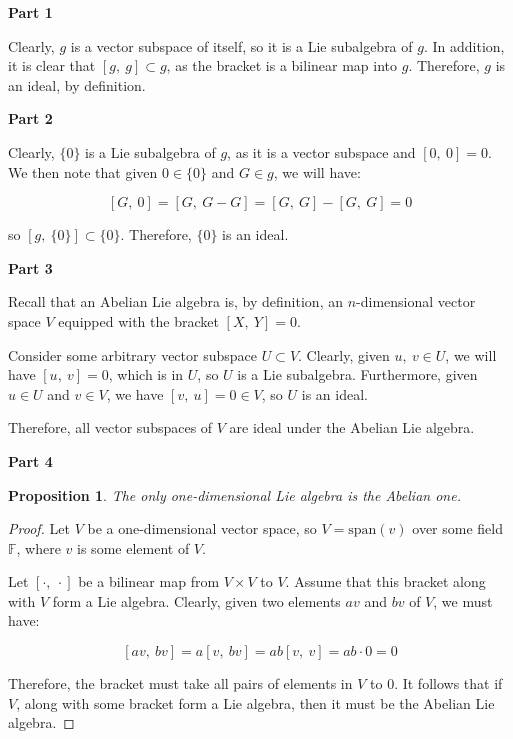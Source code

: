 \documentclass[10pt, oneside]{article}
\newtheorem{prop}{Proposition}
\begin{document}
    \textbf{Part 1}
    \newline

    Clearly, $g$ is a vector subspace of itself, so it is a Lie subalgebra of $g$. In addition, it is clear that $[g, \ g] \subset g$, as the bracket is a bilinear
    map into $g$. Therefore, $g$ is an ideal, by definition.
    \newline

    \textbf{Part 2}
    \newline

    Clearly, $\{0\}$ is a Lie subalgebra of $g$, as it is a vector subspace and $[0, \ 0] = 0$. We then note that given $0 \in \{0\}$ and $G \in g$, we will have:

    $$[G, \ 0] = [G, \ G - G] = [G, \ G] - [G, \ G] = 0$$

    so $[g, \ \{0\}] \subset \{0\}$. Therefore, $\{0\}$ is an ideal.
    \newline

    \textbf{Part 3}
    \newline

    Recall that an Abelian Lie algebra is, by definition, an $n$-dimensional vector space $V$ equipped with the bracket $[X, \ Y] = 0$.
    \newline

    Consider some arbitrary vector subspace $U \subset V$. Clearly, given $u, \ v \in U$, we will have $[u, \ v] = 0$, which is in $U$, so
    $U$ is a Lie subalgebra. Furthermore, given $u \in U$ and $v \in V$, we have $[v, \ u] = 0 \in V$, so $U$ is an ideal.
    \newline

    Therefore, all vector subspaces of $V$ are ideal under the Abelian Lie algebra.
    \newline

    \textbf{Part 4}
    \newline

    \begin{prop}
      The only one-dimensional Lie algebra is the Abelian one.
    \end{prop}

    \begin{proof}
      Let $V$ be a one-dimensional vector space, so $V = \text{span}(v)$ over some field $\mathbb{F}$, where $v$ is some element of $V$.
      \newline

      Let $[\cdot, \ \cdot]$ be a bilinear map from $V \times V$ to $V$. Assume that this bracket along with $V$ form a Lie algebra. Clearly,
      given two elements $av$ and $bv$ of $V$, we must have:

      $$[av, \ bv] = a[v, \ bv] = ab[v, \ v] = ab \cdot 0 = 0$$

      Therefore, the bracket must take all pairs of elements in $V$ to $0$. It follows that if $V$, along with some bracket form a Lie algebra, then
      it must be the Abelian Lie algebra.
    \end{proof}
\end{document}
